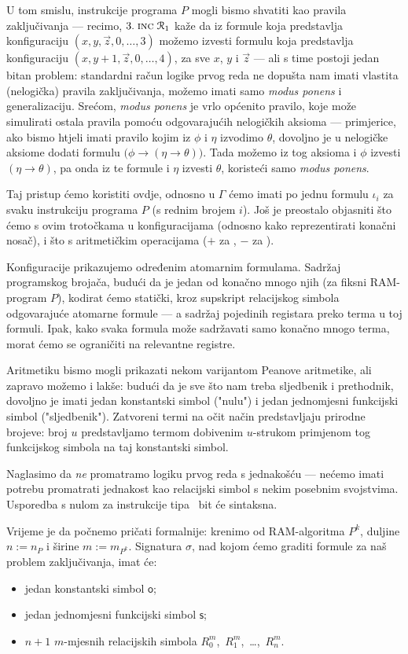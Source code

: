 U tom smislu, instrukcije programa $P$ mogli bismo shvatiti kao pravila zaključivanja --- recimo, $3.\;\textsc{inc}\;\mathcal R_{1}$ kaže da iz formule koja predstavlja konfiguraciju $(x,y,\vec z,0,\dotsc,3)$ možemo izvesti formulu koja predstavlja konfiguraciju $(x,y\!+\!1,\vec z,0,\dotsc,4)$, za sve $x$, $y$ i $\vec z$ --- ali s time postoji jedan bitan problem: standardni račun logike prvog reda ne dopušta nam imati vlastita (nelogička) pravila zaključivanja, možemo imati samo \emph{modus ponens} i generalizaciju. Srećom, \emph{modus ponens} je vrlo općenito pravilo, koje može simulirati ostala pravila pomoću odgovarajućih nelogičkih aksioma --- primjerice, ako bismo htjeli imati pravilo kojim iz $\phi$ i $\eta$ izvodimo $\theta$, dovoljno je u nelogičke aksiome dodati formulu $\bigl(\phi\to(\eta\to\theta)\bigr)$. Tada možemo iz tog aksioma i $\phi$ izvesti $(\eta\to\theta)$, pa onda iz te formule i $\eta$ izvesti $\theta$, koristeći samo \emph{modus ponens}.

Taj pristup ćemo koristiti ovdje, odnosno u $\Gamma$ ćemo imati po jednu formulu $\iota_i$ za svaku instrukciju programa $P$ (s rednim brojem $i$). Još je preostalo objasniti što ćemo s ovim trotočkama u konfiguracijama (odnosno kako reprezentirati konačni nosač), i što s aritmetičkim operacijama ($+$ za \inc, $-$ za \dec).

Konfiguracije prikazujemo određenim atomarnim formulama. Sadržaj programskog brojača, budući da je jedan od konačno mnogo njih (za fiksni RAM-program $P$), kodirat ćemo statički, kroz supskript relacijskog simbola odgovarajuće atomarne formule --- a sadržaj pojedinih registara preko terma u toj formuli. Ipak, kako svaka formula može sadržavati samo konačno mnogo terma, morat ćemo se ograničiti na relevantne registre.

Aritmetiku bismo mogli prikazati nekom
varijantom Peanove aritmetike, ali zapravo možemo i lakše: budući da je sve što nam treba sljedbenik i prethodnik, dovoljno je imati jedan konstantski simbol ("nulu") i jedan jednomjesni funkcijski simbol ("sljedbenik"). Zatvoreni termi na očit način predstavljaju prirodne brojeve: broj $u$ predstavljamo termom dobivenim $u$-strukom primjenom tog funkcijskog simbola na taj konstantski simbol.

Naglasimo da \emph{ne} promatramo logiku prvog reda s jednakošću --- nećemo imati potrebu promatrati jednakost kao relacijski simbol s nekim posebnim svojstvima. Usporedba s nulom za instrukcije tipa \dec\ bit će sintaksna.

Vrijeme je da počnemo pričati formalnije: krenimo od RAM-algoritma $P^k$, duljine $n:=n_P$ i širine $m:=m_{P^k}$. Signatura $\sigma$, nad kojom ćemo graditi formule za naš problem zaključivanja, imat će:
\begin{itemize}
    \item jedan konstantski simbol $\mathsf o$;
    \item jedan jednomjesni funkcijski simbol $\mathsf s$;
    \item $n+1$ $m$-mjesnih relacijskih simbola $R_0^m$,~$R_1^m$,~\ldots,~$R_n^m$.
\end{itemize}

